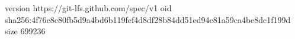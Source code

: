 version https://git-lfs.github.com/spec/v1
oid sha256:4f76c8c80fb5d9a4bd6b119fef4d8df28b84dd51ed94c81a59ca4be8dc1f199d
size 699236
